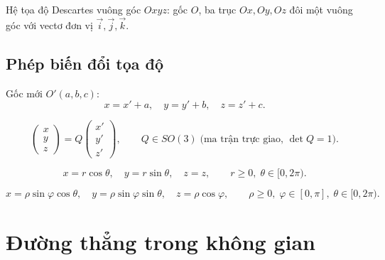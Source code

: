 \documentclass[12pt,a4paper]{article}
\begin{document}
\begin{dinhnghia}
  Hệ tọa độ Descartes vuông góc $Oxyz$: gốc $O$, ba trục $Ox, Oy, Oz$ đôi một vuông góc với vectơ đơn vị $\vec{i}, \vec{j}, \vec{k}$.
\end{dinhnghia}

\subsection{Phép biến đổi tọa độ}

\begin{congthuc}[title={Phép tịnh tiến gốc tọa độ}]
  Gốc mới $O'(a, b, c)$:
  \[
    x = x' + a, \quad y = y' + b, \quad z = z' + c.
  \]
\end{congthuc}

\begin{congthuc}[title={Phép quay trục tọa độ}]
  \[
    \begin{pmatrix} x \\ y \\ z \end{pmatrix} = Q \begin{pmatrix} x' \\ y' \\ z' \end{pmatrix}, \qquad Q \in SO(3) \;\text{(ma trận trực giao, }\det Q = 1\text{)}.
  \]
\end{congthuc}

\begin{congthuc}[title={Tọa độ trụ}]
  \[
    x = r\cos\theta, \quad y = r\sin\theta, \quad z = z, \qquad r \ge 0,\; \theta \in [0, 2\pi).
  \]
\end{congthuc}

\begin{congthuc}[title={Tọa độ cầu}]
  \[
    x = \rho\sin\varphi\cos\theta, \quad y = \rho\sin\varphi\sin\theta, \quad z = \rho\cos\varphi, \qquad \rho \ge 0,\; \varphi \in [0, \pi],\; \theta \in [0, 2\pi).
  \]
\end{congthuc}

\section{Đường thẳng trong không gian}
\end{document}
